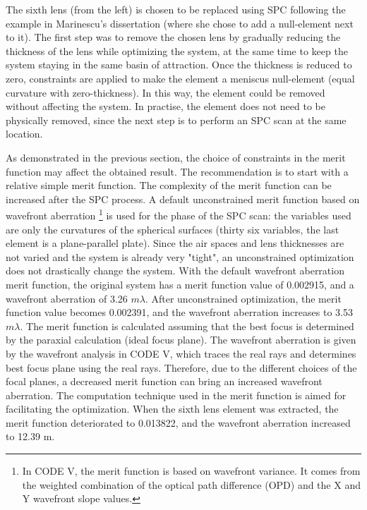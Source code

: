 The sixth lens (from the left) is chosen to be replaced using SPC following the example in Marinescu's dissertation (where she chose to add a null-element next to it). The first step was to remove the chosen lens by gradually reducing the thickness of the lens while optimizing the system, at the same time to keep the system staying in the same basin of attraction. Once the thickness is reduced to zero, constraints are applied to make the element a meniscus null-element (equal curvature with zero-thickness). In this way, the element could be removed without affecting the system. In practise, the element does not need to be physically removed, since the next step is to perform an SPC scan at the same location. 

As demonstrated in the previous section, the choice of constraints in the merit function may affect the obtained result. The recommendation is to start with a relative simple merit function. The complexity of the merit function can be increased after the SPC process. A default unconstrained merit function based on wavefront aberration \footnote{In CODE V, the merit function is based on wavefront variance. It comes from the weighted combination of the optical path difference (OPD) and the X and Y wavefront slope values.} is used for the phase of the SPC scan: the variables used are only the curvatures of the spherical surfaces (thirty six variables, the last element is a plane-parallel plate). Since the air spaces and lens thicknesses are not varied and the system is already very "tight", an unconstrained optimization does not drastically change the system. With the default wavefront aberration merit function, the original system has a merit function value of 0.002915, and a wavefront aberration of 3.26 $m\lambda$. After unconstrained optimization, the merit function value becomes 0.002391, and the wavefront aberration increases to 3.53 $m\lambda$. The merit function is calculated assuming that the best focus is determined by the paraxial calculation (ideal focus plane). The wavefront aberration is given by the wavefront analysis in CODE V, which traces the real rays and determines best focus plane using the real rays. Therefore, due to the different choices of the focal planes, a decreased merit function can bring an increased wavefront aberration. The computation technique used in the merit function is aimed for facilitating the optimization. When the sixth lens element was extracted, the merit function deteriorated to 0.013822, and the wavefront aberration increased to 12.39 m\textlambda.

